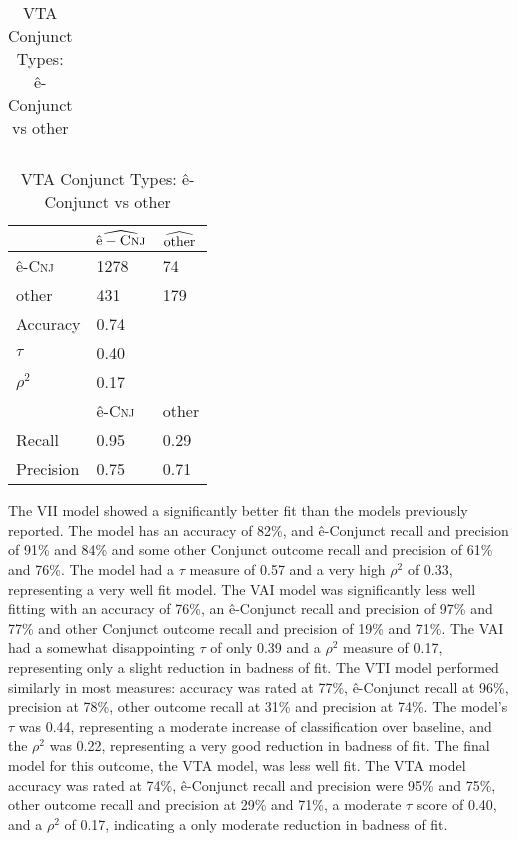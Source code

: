 \begin{table}[H]
\begin{floatrow}[2]
{\begin{tabular}{lll}
                \end{tabular}}
    {\caption{VTI Conjunct Types: ê-Conjunct vs other}
      \label{vtiivcms}}
    \hfill%
    \ttabbox%
        {                \begin{tabular}{lll}
                \toprule
                     & $\widehat{\textup{ê}-\textsc{Cnj}}$ & $\widehat{\textup{other}}$ \\
                \midrule
ê-\textsc{Cnj}         & 1278               & 74                    \\
other                  & 431                & 179                    \\
                     \midrule
                     \midrule
Accuracy             & 0.74               &                       \\
$\tau$               & 0.40               &                       \\
$\rho^{2}$           & 0.17               &                       \\
                     \midrule
                     \midrule
                     & ê-\textsc{Cnj}     & other           \\
Recall               & 0.95 & 0.29                  \\
Precision            & 0.75               & 0.71 \\
                \bottomrule
                \end{tabular}}
    {\caption{VTA Conjunct Types: ê-Conjunct vs other}
      \label{vtaivcms}}
  \end{floatrow}
\end{table}%


The VII model showed a significantly better fit than the models previously reported. The model has an accuracy of 82\%, and ê-Conjunct recall and precision of 91\% and 84\% and some other Conjunct outcome recall and precision of 61\% and 76\%. The model had a $\tau$ measure of 0.57 and a very high  $\rho^{2}$ of 0.33, representing a very well fit model. The VAI model was significantly less well fitting with an accuracy of 76\%, an ê-Conjunct recall and precision of 97\% and 77\%  and other Conjunct outcome recall and precision of 19\% and 71\%. The VAI had a somewhat disappointing $\tau$ of only 0.39 and a $\rho^{2}$ measure of 0.17, representing only a slight reduction in badness of fit. The VTI model performed similarly in most measures: accuracy was rated at 77\%,  ê-Conjunct recall at 96\%, precision at 78\%, other outcome recall at 31\% and precision at  74\%. The model's $\tau$ was 0.44, representing a moderate increase of classification over baseline, and the $\rho^{2}$ was 0.22, representing a very good reduction in badness of fit. The final model for this outcome, the VTA model, was less well fit. The VTA model accuracy was rated at 74\%, ê-Conjunct recall and precision were 95\% and 75\%, other outcome recall and precision at 29\% and 71\%, a moderate $\tau$ score of 0.40, and a $\rho^{2}$ of 0.17, indicating a only moderate reduction in badness of fit. 



